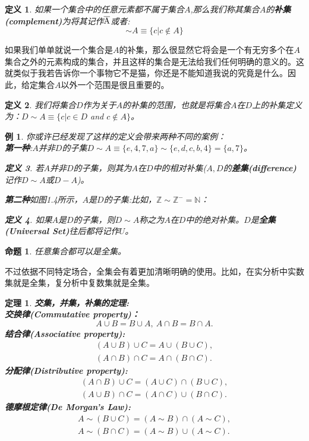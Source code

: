\documentclass[mathserif,hyperref,UTF8,openany,b5paper]{ctexbook}
\newtheorem{exmp}{例}[section]
\newtheorem{defn}{定义}[section]
\newtheorem{thm}{定理}[section]
\newtheorem{pro}{命题}[section]
\begin{document}
\begin{defn}
如果一个集合中的任意元素都不属于集合$A$,那么我们称其集合$A$的\textbf{补集(complement)}为将其记作$\overline{\rm A}$或者:
\begin{equation}
    \sim A\equiv \{c|c\not\in A\}
\end{equation}
\end{defn}
如果我们单单就说一个集合是$A$的补集，那么很显然它将会是一个有无穷多个在$A$集合之外的元素构成的集合，并且这样的集合是无法给我们任何明确的意义的。这就类似于我若告诉你一个事物它不是猫，你还是不能知道我说的究竟是什么。因此，给定集合$A$以外一个范围是很且重要的。
\begin{defn}
我们将集合$D$作为关于$A$的补集的范围，也就是将集合$A$在$D$上的补集定义为：$D\sim A \equiv \{c|c\in D $ and $ c\not \in A\} $。
\end{defn}
\begin{exmp}
你或许已经发现了这样的定义会带来两种不同的案例：\\
\textbf{第一种}:$A$并非$D$的子集$D \sim A\equiv\{e,4,7,a\} \sim \{e,d,c,b,4\} = \{a,7\}$。
\begin{defn}
若$A$并非$D$的子集，则其为$A$在$D$中的相对补集($A,D$的\textbf{差集(difference)}记作$D \sim A$或$D-A$)。
\end{defn}
\textbf{第二种}如图1.4所示，$A$是$D$的子集:比如，$\mathbb{Z}\sim\mathbb{Z}^-=\mathbb{N}$：
\begin{defn}
如果$A$是$D$的子集，则$D \sim A$称之为$A$在$D$中的绝对补集。$D$是\textbf{全集(Universal Set)}往后都将记作$U$。
\end{defn}
\end{exmp}
\begin{pro}
任意集合都可以是全集。
\end{pro}
不过依据不同特定场合，全集会有着更加清晰明确的使用。比如，在实分析中实数集就是全集，复分析中复数集就是全集。
\begin{thm}\textbf{交集，并集，补集的定理:}\\
\textbf{交换律(Commutative property)：} 
\begin{equation}
A\cup B = B\cup A,\ A \cap B = B \cap A.
\end{equation}
\textbf{结合律(Associative property):}
\begin{align}
(A \cup B )\cup C = A \cup (B\cup C ),\\
(A \cap B )\cap C = A \cap (B\cap C ).
\end{align}
\textbf{分配律(Distributive property):}
\begin{align}
(A \cap B )\cup C = (A \cup C) \cap (B\cup C ),\\
(A \cup B )\cap C = (A \cap C) \cup (B\cap C ).
\end{align}
\textbf{德摩根定律(De Morgan's Law):} 
\begin{align}
    A\sim (B\cup C) = (A\sim B)\cap (A\sim C),\\
    A\sim (B\cap C) = (A\sim B)\cup (A\sim C).
\end{align}
\end{thm}
\end{document}
